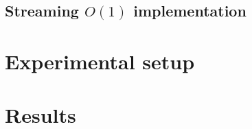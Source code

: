 \documentclass[11pt,a4paper]{article}
\begin{document}
\subsection{Streaming $O(1)$ implementation}
\label{sec:herald:streaming}


\section{Experimental setup}
\label{sec:setup}


\section{Results}
\label{sec:results}

\end{document}
